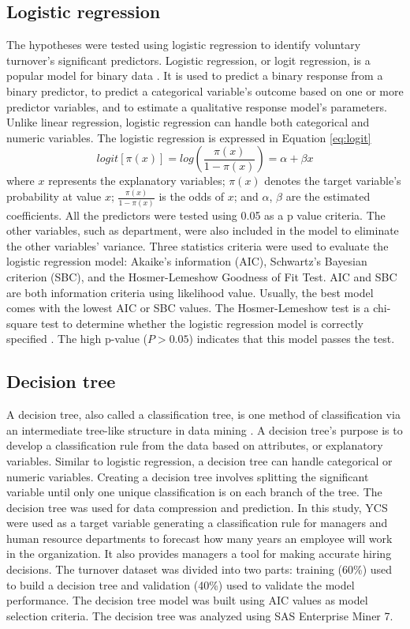 \subsection{Logistic regression}
The hypotheses were tested using logistic regression to identify voluntary turnover's significant predictors. Logistic regression, or logit regression, is a popular model for binary data \citep{RN57}. It is used to predict a binary response from a binary predictor, to predict a categorical variable's outcome based on one or more predictor variables, and to estimate a qualitative response model's parameters. Unlike linear regression, logistic regression can handle both categorical and numeric variables. The logistic regression is expressed in Equation \ref{eq:logit}
\begin{equation}
logit[\pi(x)]=log(\frac{\pi(x)} {1-\pi(x)})= \alpha+\beta x  
\label{eq:logit}            
\end{equation}
where $x$ represents the explanatory variables; $\pi(x)$ denotes the target variable's probability at value $x$; $\frac{\pi(x)} {1-\pi(x)}$ is the odds of $x$; and $\alpha$, $\beta$ are the estimated coefficients. All the predictors were tested using 0.05 as a p value criteria. The other variables, such as department, were also included in the model to eliminate the other variables' variance. Three statistics criteria were used to evaluate the logistic regression model: Akaike's information (AIC), Schwartz's Bayesian criterion (SBC), and the Hosmer-Lemeshow Goodness of Fit Test. AIC and SBC are both information criteria using likelihood value. Usually, the best model comes with the lowest AIC or SBC values. The Hosmer-Lemeshow test is a chi-square test to determine whether the logistic regression model is correctly specified \citep{hosmer2004}. The high p-value ($P>0.05$) indicates that this model passes the test. 
\subsection{Decision tree}
A decision tree, also called a classification tree, is one method of classification via an intermediate tree-like structure in data mining \citep{hand2001}. A decision tree's purpose is to develop a classification rule from the data based on attributes, or explanatory variables. Similar to logistic regression, a decision tree can handle categorical or numeric variables. Creating a decision tree involves splitting the significant variable until only one unique classification is on each branch of the tree. The decision tree was used for data compression and prediction. 
In this study, YCS were used as a target variable generating a classification rule for managers and human resource departments to forecast how many years an employee will work in the organization. It also provides managers a tool for making accurate hiring decisions. The turnover dataset was divided into two parts: training (60\%) used to build a decision tree and validation (40\%) used to validate the model performance. The decision tree model was built using AIC values as model selection criteria. The decision tree was analyzed using SAS Enterprise Miner 7. 
